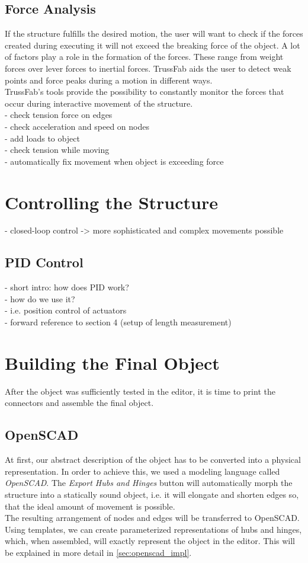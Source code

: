 \subsection{Force Analysis}
If the structure fulfills the desired motion, the user will want to check if the forces created during executing it will not exceed the breaking force of the object. A lot of factors play a role in the formation of the forces. These range from weight forces over lever forces to inertial forces. TrussFab aids the user to detect weak points and force peaks during a motion in different ways.\\
TrussFab's tools provide the possibility to constantly monitor the forces that occur during interactive movement of the structure.\\
- check tension force on edges\\
- check acceleration and speed on nodes\\
- add loads to object\\
- check tension while moving\\
- automatically fix movement when object is exceeding force\\
\section{Controlling the Structure}
- closed-loop control -> more sophisticated and complex movements possible\\
\subsection{PID Control}
- short intro: how does PID work?\\
- how do we use it?\\
- i.e. position control of actuators\\
- forward reference to section 4 (setup of length measurement)\\
\section{Building the Final Object}
After the object was sufficiently tested in the editor, it is time to print the connectors and assemble the final object.
\subsection{OpenSCAD}
At first, our abstract description of the object has to be converted into a physical representation. In order to achieve this, we used a modeling language called \textit{OpenSCAD}. The \textit{Export Hubs and Hinges} button will automatically morph the structure into a statically sound object, i.e. it will elongate and shorten edges so, that the ideal amount of movement is possible. \\
The resulting arrangement of nodes and edges will be transferred to OpenSCAD. Using templates, we can create parameterized representations of hubs and hinges, which, when assembled, will exactly represent the object in the editor. This will be explained in more detail in \ref{sec:openscad_impl}.
